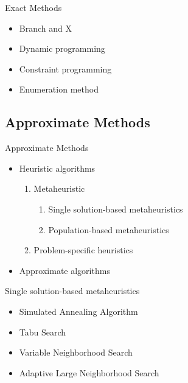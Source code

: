     \begin{frame}{Exact Methods}
      \Large
      \begin{spacing}{1.5}
        \begin{itemize}
          \item Branch and X
          \item<+-> Dynamic programming
          \item<+-> Constraint programming
          \item<+-> Enumeration method
        \end{itemize}
      \end{spacing}
    \end{frame}



    \subsection{Approximate Methods}
    \frame{\sectionpage}

    \begin{frame}{Approximate Methods}
      \Large
      \begin{itemize}
        \item Heuristic algorithms
        \vspace{4pt}
        \begin{enumerate}
          \item<+->  Metaheuristic
            \begin{enumerate}
              \item<+>[*] Single solution-based metaheuristics
              \item<+>[*] Population-based metaheuristics
            \end{enumerate}
          \vspace{4pt}
          \item<+->  Problem-specific heuristics
        \end{enumerate}
        \vspace{10pt}
        \item<+-> Approximate algorithms
      \end{itemize}
    \end{frame}

    \begin{frame}{Single solution-based metaheuristics}
      \Large
      \begin{spacing}{2}
        \begin{itemize}
          \item Simulated Annealing Algorithm
          \item Tabu Search
          \item Variable Neighborhood Search
          \item Adaptive Large Neighborhood Search
        \end{itemize}
      \end{spacing}
    \end{frame}

